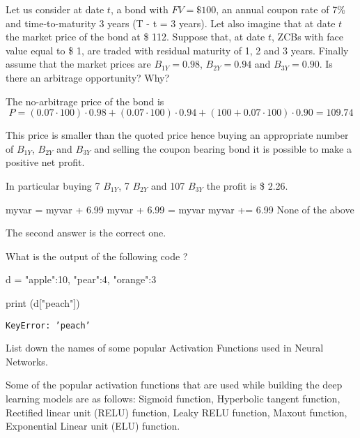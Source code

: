 \documentclass[12pt,a4paper]{exam}
\begin{document}
\question
Let us consider at date $t$, a bond with $FV = \$ 100$, an annual coupon rate of 7\% and time-to-maturity 3 years (T - t = 3 years).
Let also imagine that at date $t$ the market price of the bond at \$ 112.
Suppose that, at date $t$, ZCBs with face value equal to \$ 1, are traded with residual maturity of 1, 2 and 3 years.
Finally assume that the market prices are $B_{1Y} = 0.98$, $B_{2Y} = 0.94$ and $B_{3Y} = 0.90$.
Is there an arbitrage opportunity? Why?
\fillwithlines{3cm}
\begin{solution}
The no-arbitrage price of the bond is
\begin{equation*}
  P = (0.07\cdot100)\cdot 0.98 + (0.07\cdot100)\cdot 0.94 + (100 + 0.07\cdot100)\cdot 0.90 = 109.74
\end{equation*}

This price is smaller than the quoted price hence buying an appropriate number of $B_{1Y}$, $B_{2Y}$ and $B_{3Y}$ and selling the coupon bearing bond it is possible to make a positive net profit.

In particular buying 7 $B_{1Y}$, 7 $B_{2Y}$ and 107 $B_{3Y}$ the profit is \$ 2.26.
\end{solution}


\begin{checkboxes}
\choice myvar = myvar + 6.99
\choice myvar + 6.99 = myvar
\choice myvar += 6.99
\choice None of the above
\end{checkboxes}
\begin{solution}
The second answer is the correct one.
\end{solution}


\question
What is the output of the following code ?

\begin{ipython}
d = {"apple":10, "pear":4, "orange":3}

print (d["peach"])
\end{ipython}
\makeemptybox{3cm}
\begin{solution}
\texttt{KeyError: 'peach'}
\end{solution}

\question
List down the names of some popular Activation Functions used in Neural Networks.
\fillwithlines{3cm}
\begin{solution}
Some of the popular activation functions that are used while building the deep learning models are as follows:
Sigmoid function, Hyperbolic tangent function, Rectified linear unit (RELU) function, Leaky RELU function, Maxout function, Exponential Linear unit (ELU) function.
\end{solution}
\end{document}
